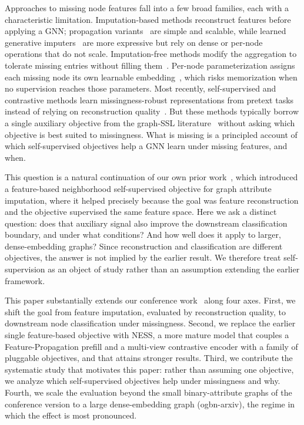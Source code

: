 Approaches to missing node features fall into a few broad families, each with a characteristic limitation. Imputation-based methods reconstruct features before applying a GNN; propagation variants~\cite{rossi2022unreasonable} are simple and scalable, while learned generative imputers~\cite{chen2020learning, yoo2022accurate} are more expressive but rely on dense or per-node operations that do not scale. Imputation-free methods modify the aggregation to tolerate missing entries without filling them~\cite{zhang2024incomplete, taguchi2021graph}. Per-node parameterization assigns each missing node its own learnable embedding~\cite{peng2023mate}, which risks memorization when no supervision reaches those parameters.
Most recently, self-supervised and contrastive methods learn missingness-robust representations from pretext tasks instead of relying on reconstruction quality~\cite{zhang2023amgcl, yu2024moba}. But these methods typically borrow a single auxiliary objective from the graph-SSL literature~\cite{hou2022graphmae, zbontar2021barlow, hassani2020mvgrl} without asking which objective is best suited to missingness. What is missing is a principled account of which self-supervised objectives help a GNN learn under missing features, and when.

This question is a natural continuation of our own prior work~\cite{ncssl}, which introduced a feature-based neighborhood self-supervised objective for graph attribute imputation, where it helped precisely because the goal was feature reconstruction and the objective supervised the same feature space. Here we ask a distinct question: does that auxiliary signal also improve the downstream classification boundary, and under what conditions? And how well does it apply to larger, dense-embedding graphs? Since reconstruction and classification are different objectives, the answer is not implied by the earlier result. We therefore treat self-supervision as an object of study rather than an assumption extending the earlier framework.

This paper substantially extends our conference work~\cite{ncssl} along four axes. First, we shift the goal from feature imputation, evaluated by reconstruction quality, to downstream node classification under missingness. Second, we replace the earlier single feature-based objective with NESS, a more mature model that couples a Feature-Propagation prefill and a multi-view contrastive encoder with a family of pluggable objectives, and that attains stronger results. Third, we contribute the systematic study that motivates this paper: rather than assuming one objective, we analyze which self-supervised objectives help under missingness and why. Fourth, we scale the evaluation beyond the small binary-attribute graphs of the conference version to a large dense-embedding graph (ogbn-arxiv), the regime in which the effect is most pronounced.

